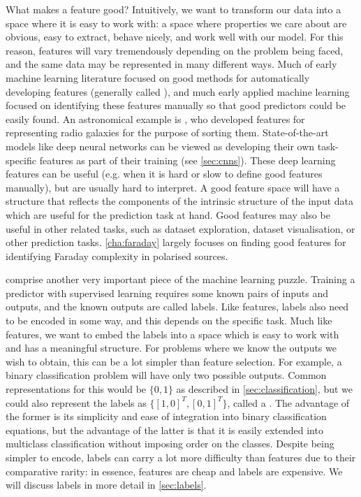     What makes a feature good? Intuitively, we want to transform our data into a space where it is easy to work with: a space where properties we care about are obvious, easy to extract, behave nicely, and work well with our model. For this reason, features will vary tremendously depending on the problem being faced, and the same data may be represented in many different ways. Much of early machine learning literature focused on good methods for automatically developing features (generally called ), and much early applied machine learning focused on identifying these features manually so that good predictors could be easily found. An astronomical example is \citet{proctor06}, who developed features for representing radio galaxies for the purpose of sorting them. State-of-the-art models like deep neural networks \citep[e.g.][]{dieleman15cnn} can be viewed as developing their own task-specific features as part of their training (see \autoref{sec:cnns}). These deep learning features can be useful (e.g. when it is hard or slow to define good features manually), but are usually hard to interpret. A good feature space will have a structure that reflects the components of the intrinsic structure of the input data which are useful for the prediction task at hand. Good features may also be useful in other related tasks, such as dataset exploration, dataset visualisation, or other prediction tasks. \autoref{cha:faraday} largely focuses on finding good features for identifying Faraday complexity in polarised sources.

     comprise another very important piece of the machine learning puzzle. Training a predictor with supervised learning requires some known pairs of inputs and outputs, and the known outputs are called labels. Like features, labels also need to be encoded in some way, and this depends on the specific task. Much like features, we want to embed the labels into a space which is easy to work with and has a meaningful structure. For problems where we know the outputs we wish to obtain, this can be a lot simpler than feature selection. For example, a binary classification problem will have only two possible outputs. Common representations for this would be $\{0, 1\}$ as described in \autoref{sec:classification}, but we could also represent the labels as $\{[1, 0]^T, [0, 1]^T\}$, called a . The advantage of the former is its simplicity and ease of integration into binary classification equations, but the advantage of the latter is that it is easily extended into multiclass classification without imposing order on the classes. Despite being simpler to encode, labels can carry a lot more difficulty than features due to their comparative rarity: in essence, features are cheap and labels are expensive. We will discuss labels in more detail in \autoref{sec:labels}.

